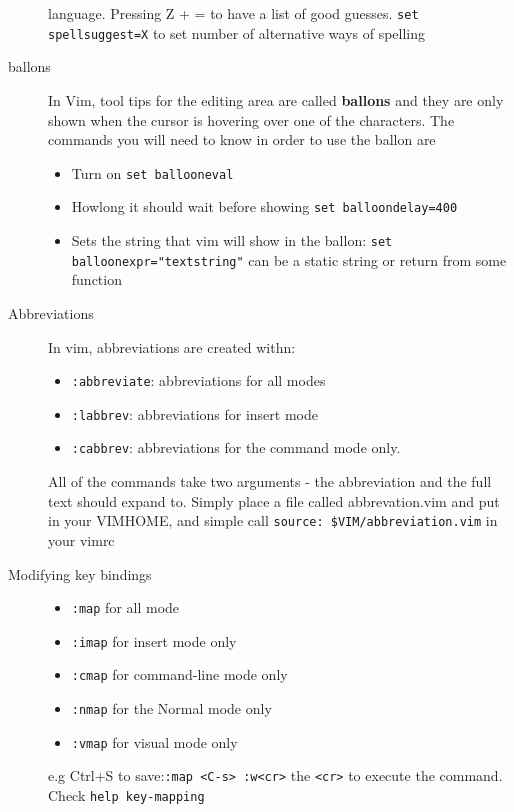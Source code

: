 \documentclass[11pt]{book}
\begin{document}
\begin{description}
language. Pressing Z + = to have a list of good guesses.
 \verb|set spellsuggest=X| to set number of alternative ways of spelling
\item[ballons] In Vim, tool tips for the editing area are called
\textbf{ballons} and they are only shown when the cursor is hovering over one of
the characters. The commands you will need to know in order to use the ballon
are
    \begin{itemize}
        \item Turn on \verb|set ballooneval|
        \item Howlong it should wait before showing \verb|set balloondelay=400|
        \item Sets the string that vim will show in the ballon:
            \verb|set balloonexpr="textstring"| can be a static string or return
            from some function
    \end{itemize}
\item[Abbreviations] In vim, abbreviations are created withn:
    \begin{itemize}
        \item \verb|:abbreviate|: abbreviations for all modes
        \item \verb|:labbrev|: abbreviations for insert mode
        \item \verb|:cabbrev|: abbreviations for the command mode only.
    \end{itemize}
    All of the commands take two arguments - the abbreviation and the full text
    should expand to.
    Simply place a file called abbrevation.vim and put in your VIMHOME, and
    simple call \verb|source: $VIM/abbreviation.vim| in your vimrc
\item[Modifying key bindings]
    \begin{itemize}
    \item \verb|:map| for all mode
    \item \verb|:imap| for insert mode only
    \item \verb|:cmap| for command-line mode only
    \item \verb|:nmap| for the Normal mode only
    \item \verb|:vmap| for visual mode only
    \end{itemize}
    e.g Ctrl+S to save:\verb|:map <C-s> :w<cr>| the \verb|<cr>| to execute the
    command. Check \verb|help key-mapping|
\end{description}
\end{document}
